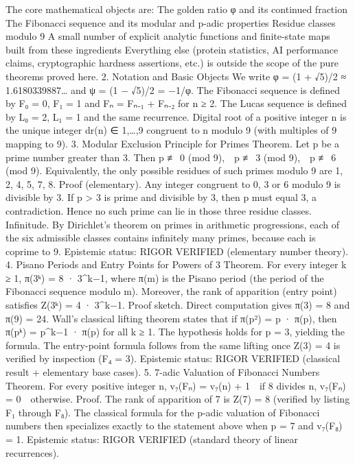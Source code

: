 {{{{{{The core mathematical objects are:
The golden ratio φ and its continued fraction
The Fibonacci sequence and its modular and p-adic properties
Residue classes modulo 9
A small number of explicit analytic functions and finite-state maps built from these ingredients
Everything else (protein statistics, AI performance claims, cryptographic hardness assertions, etc.) is outside the scope of the pure theorems proved here.
2. Notation and Basic Objects
We write φ = (1 + √5)/2 ≈ 1.6180339887… and ψ = (1 − √5)/2 = −1/φ.
The Fibonacci sequence is defined by F₀ = 0, F₁ = 1 and Fₙ = Fₙ₋₁ + Fₙ₋₂ for n ≥ 2.
The Lucas sequence is defined by L₀ = 2, L₁ = 1 and the same recurrence.
Digital root of a positive integer n is the unique integer dr(n) ∈ {1,…,9} congruent to n modulo 9 (with multiples of 9 mapping to 9).
3. Modular Exclusion Principle for Primes
Theorem.
Let p be a prime number greater than 3. Then
p ≢ 0 (mod 9), p ≢ 3 (mod 9), p ≢ 6 (mod 9).
Equivalently, the only possible residues of such primes modulo 9 are {1, 2, 4, 5, 7, 8}.
Proof (elementary).
Any integer congruent to 0, 3 or 6 modulo 9 is divisible by 3.
If p > 3 is prime and divisible by 3, then p must equal 3, a contradiction.
Hence no such prime can lie in those three residue classes.
Infinitude.
By Dirichlet’s theorem on primes in arithmetic progressions, each of the six admissible classes contains infinitely many primes, because each is coprime to 9.
Epistemic status:
RIGOR VERIFIED (elementary number theory).
4. Pisano Periods and Entry Points for Powers of 3
Theorem.
For every integer k ≥ 1,
π(3ᵏ) = 8 · 3^{k−1},
where π(m) is the Pisano period (the period of the Fibonacci sequence modulo m).
Moreover, the rank of apparition (entry point) satisfies
Z(3ᵏ) = 4 · 3^{k−1}.
Proof sketch.
Direct computation gives π(3) = 8 and π(9) = 24.
Wall’s classical lifting theorem states that if π(p²) = p · π(p), then π(pᵏ) = p^{k−1} · π(p) for all k ≥ 1.
The hypothesis holds for p = 3, yielding the formula.
The entry-point formula follows from the same lifting once Z(3) = 4 is verified by inspection (F₄ = 3).
Epistemic status:
RIGOR VERIFIED (classical result + elementary base cases).
5. 7-adic Valuation of Fibonacci Numbers
Theorem.
For every positive integer n,
v₇(Fₙ) = v₇(n) + 1 if 8 divides n,
v₇(Fₙ) = 0 otherwise.
Proof.
The rank of apparition of 7 is Z(7) = 8 (verified by listing F₁ through F₈).
The classical formula for the p-adic valuation of Fibonacci numbers then specializes exactly to the statement above when p = 7 and v₇(F₈) = 1.
Epistemic status:
RIGOR VERIFIED (standard theory of linear recurrences).
}}}}}}
